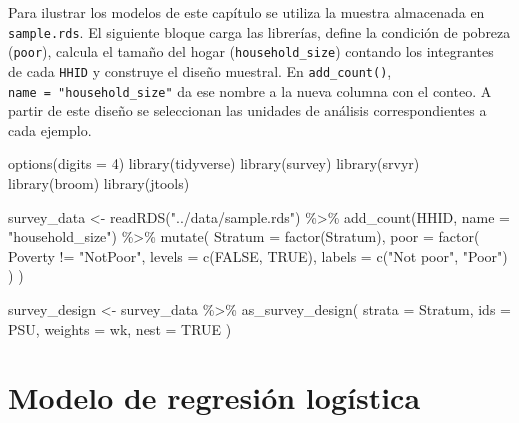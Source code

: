 \documentclass[
  spanish,
  11pt,
  letterpaper,
  oneside,
  open=any]{scrbook}
\newenvironment{Shaded}{\begin{snugshade}}{\end{snugshade}}
\newcommand{\AttributeTok}[1]{\textcolor[rgb]{0.40,0.45,0.13}{#1}}
\newcommand{\ConstantTok}[1]{\textcolor[rgb]{0.56,0.35,0.01}{#1}}
\newcommand{\DecValTok}[1]{\textcolor[rgb]{0.68,0.00,0.00}{#1}}
\newcommand{\FunctionTok}[1]{\textcolor[rgb]{0.28,0.35,0.67}{#1}}
\newcommand{\NormalTok}[1]{\textcolor[rgb]{0.00,0.23,0.31}{#1}}
\newcommand{\OtherTok}[1]{\textcolor[rgb]{0.00,0.23,0.31}{#1}}
\newcommand{\SpecialCharTok}[1]{\textcolor[rgb]{0.37,0.37,0.37}{#1}}
\newcommand{\StringTok}[1]{\textcolor[rgb]{0.13,0.47,0.30}{#1}}
\begin{document}
Para ilustrar los modelos de este capítulo se utiliza la muestra
almacenada en \texttt{sample.rds}. El siguiente bloque carga las
librerías, define la condición de pobreza (\texttt{poor}), calcula el
tamaño del hogar (\texttt{household\_size}) contando los integrantes de
cada \texttt{HHID} y construye el diseño muestral. En
\texttt{add\_count()}, \texttt{name\ =\ "household\_size"} da ese nombre
a la nueva columna con el conteo. A partir de este diseño se seleccionan
las unidades de análisis correspondientes a cada ejemplo.

\begin{Shaded}
\begin{Highlighting}[]
\FunctionTok{options}\NormalTok{(}\AttributeTok{digits =} \DecValTok{4}\NormalTok{)}
\FunctionTok{library}\NormalTok{(tidyverse)}
\FunctionTok{library}\NormalTok{(survey)}
\FunctionTok{library}\NormalTok{(srvyr)}
\FunctionTok{library}\NormalTok{(broom)}
\FunctionTok{library}\NormalTok{(jtools)}

\NormalTok{survey\_data }\OtherTok{\textless{}{-}} \FunctionTok{readRDS}\NormalTok{(}\StringTok{"../data/sample.rds"}\NormalTok{) }\SpecialCharTok{\%\textgreater{}\%}
  \FunctionTok{add\_count}\NormalTok{(HHID, }\AttributeTok{name =} \StringTok{"household\_size"}\NormalTok{) }\SpecialCharTok{\%\textgreater{}\%}
  \FunctionTok{mutate}\NormalTok{(}
    \AttributeTok{Stratum =} \FunctionTok{factor}\NormalTok{(Stratum),}
    \AttributeTok{poor =} \FunctionTok{factor}\NormalTok{(}
\NormalTok{      Poverty }\SpecialCharTok{!=} \StringTok{"NotPoor"}\NormalTok{,}
      \AttributeTok{levels =} \FunctionTok{c}\NormalTok{(}\ConstantTok{FALSE}\NormalTok{, }\ConstantTok{TRUE}\NormalTok{),}
      \AttributeTok{labels =} \FunctionTok{c}\NormalTok{(}\StringTok{"Not poor"}\NormalTok{, }\StringTok{"Poor"}\NormalTok{)}
\NormalTok{    )}
\NormalTok{  )}

\NormalTok{survey\_design }\OtherTok{\textless{}{-}}\NormalTok{ survey\_data }\SpecialCharTok{\%\textgreater{}\%}
  \FunctionTok{as\_survey\_design}\NormalTok{(}
    \AttributeTok{strata =}\NormalTok{ Stratum,}
    \AttributeTok{ids =}\NormalTok{ PSU,}
    \AttributeTok{weights =}\NormalTok{ wk,}
    \AttributeTok{nest =} \ConstantTok{TRUE}
\NormalTok{  )}
\end{Highlighting}
\end{Shaded}

\section{Modelo de regresión logística}\label{sec-logistica}
\end{document}
